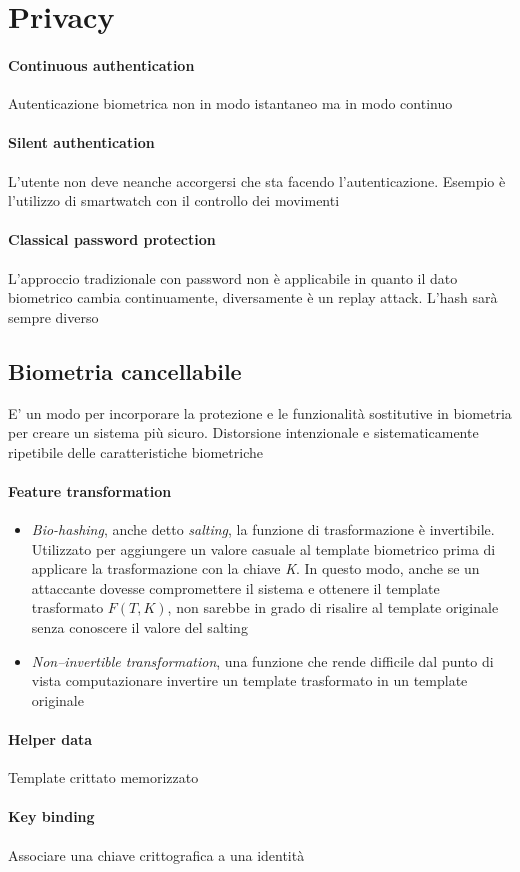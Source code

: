 \section{Privacy}

\paragraph{Continuous authentication}
Autenticazione biometrica non in modo istantaneo ma in modo continuo

\paragraph{Silent authentication}
L’utente non deve neanche accorgersi che sta facendo l’autenticazione. Esempio è l'utilizzo di smartwatch con il controllo dei movimenti

\paragraph{Classical password protection}
L’approccio tradizionale con password non è applicabile in quanto il dato biometrico cambia continuamente, diversamente è un replay attack. L’hash sarà sempre diverso

\subsection{Biometria cancellabile}
E' un modo per incorporare la protezione e le funzionalità sostitutive in biometria per creare un sistema più sicuro. Distorsione intenzionale e sistematicamente ripetibile delle caratteristiche biometriche

\paragraph{Feature transformation}
\begin{itemize}
    \item \textit{Bio-hashing}, anche detto \textit{salting}, la funzione di trasformazione è invertibile. Utilizzato per aggiungere un valore casuale al template biometrico prima di applicare la trasformazione con la chiave \textit{K}. In questo modo, anche se un attaccante dovesse compromettere il sistema e ottenere il template trasformato $F(T,K)$, non sarebbe in grado di risalire al template originale senza conoscere il valore del salting
    \item \textit{Non–invertible transformation}, una funzione che rende difficile dal punto di vista computazionare invertire un template trasformato in un template originale
\end{itemize}

\paragraph{Helper data} 
Template crittato memorizzato

\paragraph{Key binding}
Associare una chiave crittografica a una identità

\newpage